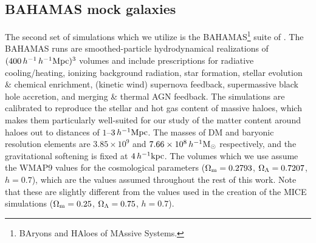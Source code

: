 \documentclass[usenatbib]{mnras}
\newcommand{\homsun}{\,h^{-1} {\rm M_\odot}}
\newcommand{\hkpc}{\, h^{-1}{\rm{kpc}} }
\newcommand{\hMpc}{\, h^{-1}{\rm{Mpc}} }
\newcommand{\un}[1]{_{\rm #1}}
\newcommand{\dex}{\, {\rm dex}}
\begin{document}


\subsection{BAHAMAS mock galaxies}
\label{sec:bahamas_mocks}
The second set of simulations which we utilize is the BAHAMAS\footnote{BAryons and HAloes of MAssive Systems.} suite of \citet{mccarthy2017}. The BAHAMAS runs are smoothed-particle hydrodynamical realizations of $(400\,h^{-1}\hMpc)^3$ volumes and include prescriptions for radiative cooling/heating, ionizing background radiation, star formation, stellar evolution \& chemical enrichment, (kinetic wind) supernova feedback, supermassive black hole accretion, and merging \& thermal AGN feedback. The simulations are calibrated to reproduce the stellar and hot gas content of massive haloes, which makes them particularly well-suited for our study of the matter content around haloes out to distances of $1$--$3\hMpc$. The masses of DM and baryonic resolution elements are $3.85\times 10^9$ and $7.66\times 10^8 \homsun$ respectively, and the gravitational softening is fixed at $4 \hkpc$.
The volumes which we use assume the WMAP9 values for the cosmological parameters ($\Omega\un{m}=0.2793$, $\Omega\un{\Lambda}=0.7207$, $h=0.7$), which are the values assumed throughout the rest of this work. Note that these are slightly different from the values used in the creation of the MICE simulations ($\Omega\un{m}=0.25$, $\Omega\un{\Lambda}=0.75$, $h=0.7$).
\end{document}
